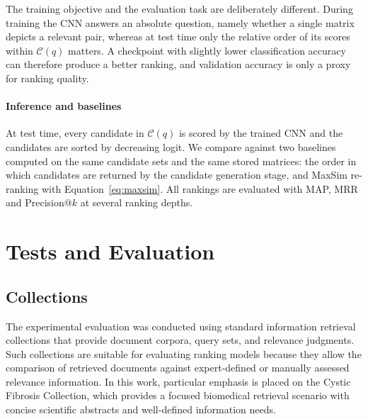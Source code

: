 \documentclass[preprint,5p,times,twocolumn,authoryear]{elsarticle}
\begin{document}
The training objective and the evaluation task are deliberately different. During training the CNN answers an absolute question, namely whether a single matrix depicts a relevant pair, whereas at test time only the relative order of its scores within $\mathcal{C}(q)$ matters. A checkpoint with slightly lower classification accuracy can therefore produce a better ranking, and validation accuracy is only a proxy for ranking quality.

\paragraph{Inference and baselines}
At test time, every candidate in $\mathcal{C}(q)$ is scored by the trained CNN and the candidates are sorted by decreasing logit. We compare against two baselines computed on the same candidate sets and the same stored matrices: the order in which candidates are returned by the candidate generation stage, and MaxSim re-ranking with Equation~\eqref{eq:maxsim}. All rankings are evaluated with MAP, MRR and Precision@$k$ at several ranking depths.


\section{Tests and Evaluation}



\subsection{Collections}
The experimental evaluation was conducted using standard information retrieval collections that provide document corpora, query sets, and relevance judgments. Such collections are suitable for evaluating ranking models because they allow the comparison of retrieved documents against expert-defined or manually assessed relevance information. In this work, particular emphasis is placed on the Cystic Fibrosis Collection, which provides a focused biomedical retrieval scenario with concise scientific abstracts and well-defined information needs.
\end{document}
